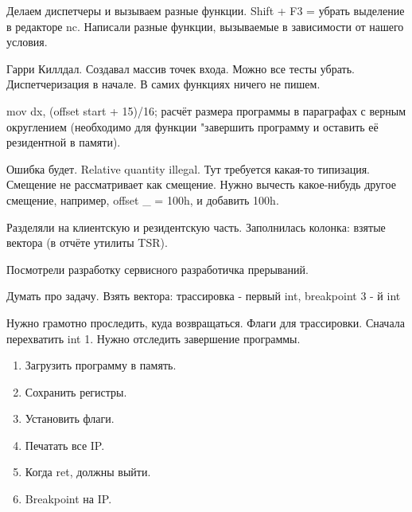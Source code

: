 Делаем диспетчеры и вызываем разные функции.
Shift + F3 = убрать выделение в редакторе nc.
Написали разные функции, вызываемые в зависимости от нашего условия. 

Гарри Киллдал. Создавал массив точек входа. Можно все тесты убрать. Диспетчеризация в начале. В самих функциях ничего не пишем.

mov dx, (offset start + 15)/16; расчёт размера программы в параграфах с верным округлением (необходимо для функции "завершить программу и оставить её резидентной в памяти). 

Ошибка будет. Relative quantity illegal. Тут требуется какая-то типизация. Смещение не рассматривает как смещение. Нужно вычесть какое-нибудь другое смещение, например, offset \_ = 100h, и добавить 100h.

Разделяли на клиентскую и резидентскую часть. Заполнилась колонка: взятые вектора (в отчёте утилиты TSR).

Посмотрели разработку сервисного разработичка прерываний. 
\begin{hw} Думать про задачу. Взять вектора: трассировка - первый int, breakpoint 3 - й int \end{hw}

Нужно грамотно проследить, куда возвращаться. Флаги для трассировки. Сначала перехватить int 1. Нужно отследить завершение программы. 
\begin{enumerate}
\item Загрузить программу в память. 
\item Сохранить регистры.
\item Установить флаги.
\item Печатать все IP.  
\item Когда ret, должны выйти.
\item Breakpoint на IP. 
\end{enumerate}
